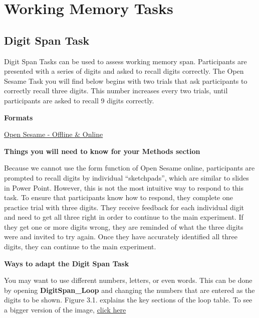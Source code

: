 \documentclass[
]{book}
\begin{document}
\hypertarget{working-memory-tasks}{%
\chapter{Working Memory Tasks}\label{working-memory-tasks}}

\hypertarget{digit-span-task}{%
\section{Digit Span Task}\label{digit-span-task}}

Digit Span Tasks can be used to assess working memory span. Participants are presented with a series of digits and asked to recall digits correctly. The Open Sesame Task you will find below begins with two trials that ask participants to correctly recall three digits. This number increases every two trials, until participants are asked to recall 9 digits correctly.

\textbf{Formats}

\href{GitHub/DigitSpan_Online.osexp}{Open Sesame - Offline \& Online}

\textbf{Things you will need to know for your Methods section}

Because we cannot use the form function of Open Sesame online, participants are prompted to recall digits by individual ``sketchpads'', which are similar to slides in Power Point. However, this is not the most intuitive way to respond to this task. To ensure that participants know how to respond, they complete one practice trial with three digits. They receive feedback for each individual digit and need to get all three right in order to continue to the main experiment. If they get one or more digits wrong, they are reminded of what the three digits were and invited to try again. Once they have accurately identified all three digits, they can continue to the main experiment.

\textbf{Ways to adapt the Digit Span Task}

You may want to use different numbers, letters, or even words. This can be done by opening \textbf{DigitSpan\_Loop} and changing the numbers that are entered as the digits to be shown. Figure 3.1. explains the key sections of the loop table. To see a bigger version of the image, \href{https://raw.githubusercontent.com/jmattschey/MScConversionExperiments/master/images/ChangeDigitSpan.png}{click here}
\end{document}
